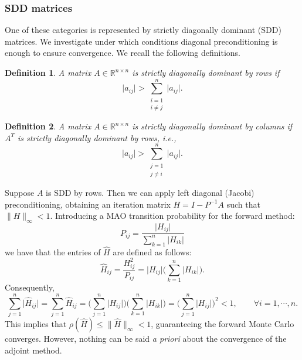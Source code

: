 \documentclass[times]{nlaauth}
\newtheorem{defn}{Definition}
\begin{document}
\subsubsection{SDD matrices}
\label{sec:sdd}

One of these categories is represented by strictly diagonally dominant
(SDD) matrices. We investigate under which conditions diagonal preconditioning
is enough to ensure convergence.
We recall the following definitions.

\begin{defn}
 A matrix $A\in\mathbb{R}^{n\times n}$ is strictly diagonally dominant
by rows if
 \begin{equation}
    \lvert a_{ij}\rvert>\sum_{\substack{i=1\\ i\ne j}}^{n}\lvert
a_{ij}\rvert .
\label{sddr}
 \end{equation}
\end{defn}

\begin{defn}
 A matrix $A\in\mathbb{R}^{n\times n}$ is strictly diagonally dominant
by columns if $A^T$ is strictly diagonally dominant by rows, i.e.,
 \begin{equation}
    \lvert a_{ij}\rvert>\sum_{\substack{j=1\\ j\ne i}}^{n}\lvert
a_{ij}\rvert .
\label{sddc}
 \end{equation}
\end{defn}

Suppose $A$ is SDD by rows. Then we can apply left diagonal (Jacobi) preconditioning,
obtaining an iteration matrix $H=I-P^{-1}A$ such that $\lVert H
\rVert_{\infty}<1$.
Introducing a MAO transition probability for the forward method:
\[
 P_{ij}=\frac{\lvert H_{ij}\rvert}{\sum_{k=1}^n\lvert H_{ik}\rvert}
\]
we have that the entries of $\hat{H}$ are defined as follows:
\[
 \hat{H}_{ij}=\frac{H^2_{ij}}{P_{ij}}=\lvert H_{ij}\rvert\bigg
(\sum_{k=1}^n\lvert
H_{ik}\rvert\bigg ).
\]
Consequently,
\[
 \sum_{j=1}^n\lvert \hat{H}_{ij} \rvert = \sum_{j=1}^n \hat{H}_{ij} =\bigg
(\sum_{j=1}^n \lvert H_{ij}\rvert\bigg )\bigg (\sum_{k=1}^n\lvert
H_{ik}\rvert\bigg ) =\bigg
(\sum_{j=1}^n \lvert H_{ij}\rvert\bigg ) ^2 <1, \qquad \forall i=1,\cdots, n.
\]
This implies that $\rho(\hat{H})\le \lVert
\hat{H}\rVert_{\infty}<1$, guaranteeing the forward Monte Carlo converges.
However, nothing can be said {\em a priori}
about the convergence of the adjoint method.
\end{document}
